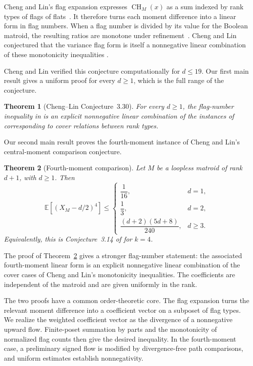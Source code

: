 \documentclass[11pt]{amsart}
\newtheorem{theorem}{Theorem}[section]
\theoremstyle{definition}
\theoremstyle{remark}
\newcommand{\CH}{\operatorname{CH}}
\newcommand{\E}{\mathbb E}
\begin{document}
Cheng and Lin's flag expansion expresses $\CH_M(x)$ as a sum indexed by rank
types of flags of flats~\cite[Proposition~3.26]{ChengLin}.  It therefore
turns each moment difference into a linear form in flag numbers.  When a
flag number is divided by its value for the Boolean matroid, the resulting
ratios are monotone under refinement~\cite[Lemma~3.29]{ChengLin}.  Cheng and
Lin conjectured that the variance flag form is itself a nonnegative linear
combination of these monotonicity inequalities
\cite[Conjecture~3.30]{ChengLin}.

Cheng and Lin verified this conjecture computationally for $d\le19$.  Our
first main result gives a uniform proof for every $d\ge1$, which is the full
range of the conjecture.

\begin{theorem}[Cheng--Lin Conjecture~3.30]
\label{thm:intro-k2}
For every $d\ge1$, the flag-number inequality in
\cite[Corollary~3.28]{ChengLin} is an explicit nonnegative linear combination
of the instances of \cite[Lemma~3.29]{ChengLin} corresponding to cover
relations between rank types.
\end{theorem}

Our second main result proves the fourth-moment instance of Cheng and Lin's
central-moment comparison conjecture. 

\begin{theorem}[Fourth-moment comparison]
\label{thm:intro-k4}
Let $M$ be a loopless matroid of rank $d+1$, with $d\ge1$.  Then
\begin{equation}
 \E\left[(X_M-d/2)^4\right]\le
 \begin{cases}
  \dfrac1{16},&d=1,\\[4pt]
  \dfrac13,&d=2,\\[4pt]
  \dfrac{(d+2)(5d+8)}{240},&d\ge3.
 \end{cases}
 \label{eq:intro-k4-bound}
\end{equation}
Equivalently, this is Conjecture~3.14 of \cite{ChengLin} for $k=4$.
\end{theorem}

The proof of Theorem~\ref{thm:intro-k4} gives a stronger flag-number
statement: the associated fourth-moment linear form is an explicit
nonnegative linear combination of the cover cases of Cheng and Lin's
monotonicity inequalities.  The coefficients are independent of the matroid
and are given uniformly in the rank.

The two proofs have a common order-theoretic core.  The flag expansion turns
the relevant moment difference into a coefficient vector on a subposet of
flag types.  We realize the weighted coefficient vector as the divergence of
a nonnegative upward flow.  Finite-poset summation by parts and the
monotonicity of normalized flag counts then give the desired inequality.  In
the fourth-moment case, a preliminary signed flow is modified by
divergence-free path comparisons, and uniform estimates establish
nonnegativity.
\end{document}
